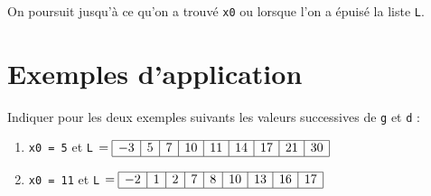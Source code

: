 On poursuit jusqu'à ce qu'on a trouvé \lstinline{x0} ou lorsque l'on a épuisé la liste \lstinline{L}.





\section{Exemples d'application}



Indiquer pour les deux exemples suivants les valeurs successives de \lstinline{g} et \lstinline{d} :
\begin{enumerate}
\item \lstinline{x0 = 5} et \lstinline{L} $= \begin{array}{|c|c|c|c|c|c|c|c|c|} 
\hline -3 & 5 & 7 & 10 & 11 & 14 & 17 & 21 & 30 \\ \hline
\end{array}$



\item \lstinline{x0 = 11} et \lstinline{L} $= \begin{array}{|c|c|c|c|c|c|c|c|c|} 
\hline -2 & 1 & 2 & 7 & 8 & 10 & 13 & 16 & 17  \\ \hline
\end{array}$

\end{enumerate}


